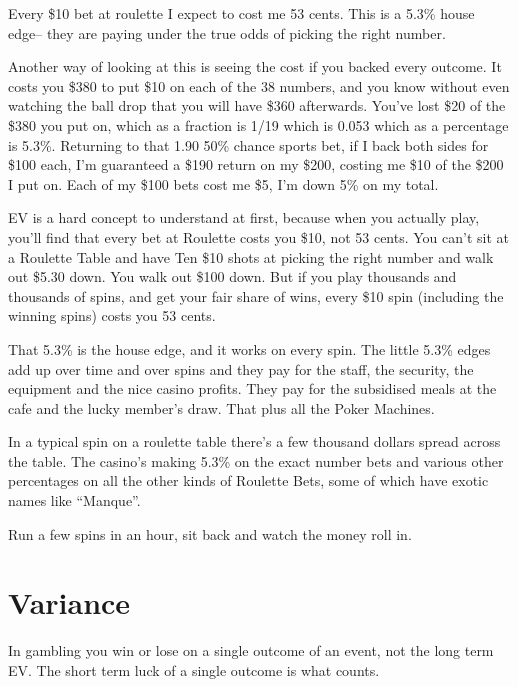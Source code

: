 Every \$10 bet at roulette I expect to cost me 53 cents. This is a 5.3\% house
edge-- they are paying under the true odds of picking the right
number.

Another way of looking at this is seeing the cost if you backed every
outcome. It costs you \$380 to put \$10 on each of the 38 numbers, and
you know without even watching the ball drop that you will have \$360
afterwards. You've lost \$20 of the \$380 you put on, which as a
fraction is 1/19 which is 0.053 which as a percentage is 5.3\%.
Returning to that 1.90 50\% chance sports bet, if I back both sides for
\$100 each, I'm guaranteed a \$190 return on my \$200, costing me \$10
of the \$200 I put on. Each of my \$100 bets cost me \$5, I'm down 5\%
on my total.


EV is a hard concept to understand at first, because when you actually
play, you'll find that every bet at Roulette costs you \$10, not
53 cents. You can't sit at a Roulette Table and
have Ten \$10 shots at picking the right number and walk out \$5.30
down. You walk out \$100 down. But if you play thousands and thousands
of spins, and get your fair share of wins, every \$10 spin (including
the winning spins) costs you 53 cents.

That 5.3\% is the house edge, and it works on every spin. The little 5.3\%
edges add up over time and over spins and they pay for the staff, the
security, the equipment and the nice casino profits. They pay for the
subsidised meals at the cafe and the lucky member's draw. That plus
all the Poker Machines.

In a typical spin on a roulette table there's a few thousand dollars
spread across the table. The casino's making 5.3\% on the exact number
bets and various other percentages on all the other kinds of Roulette Bets,
some of which have exotic names like ``Manque''.

Run a few spins in an hour, sit back and watch the money roll in.

\section{Variance}

In gambling you win or lose on a single outcome of an event,
not the long term EV. The short term luck of a single outcome
is what counts.

